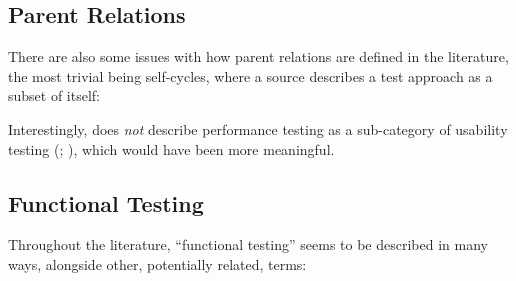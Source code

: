 \subsection{Parent Relations}

There are also some issues with how parent relations are defined in the
literature, the most trivial being self-cycles, where a source describes a
test approach as a subset of itself:



Interestingly, \citeauthor{Gerrard2000a} does \emph{not} describe performance
testing as a sub-category of usability testing (\citeyear[Tab.~2]{Gerrard2000a};
\citeyear[Tab.~1]{Gerrard2000b}), which would have been more meaningful.

\subsection{Functional Testing}

Throughout the literature, ``functional testing'' seems to be described in many
ways, alongside other, potentially related, terms:


